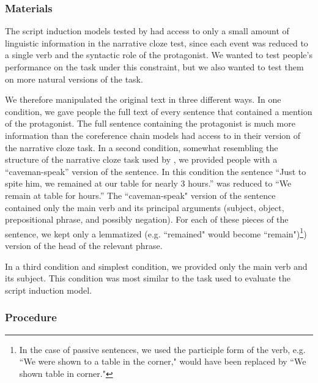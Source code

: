 \documentclass[10pt,a4paper]{article}
\begin{document}
\subsubsection{Materials}

The script induction models tested by  had access to only a small amount of linguistic information in the narrative cloze test, since each event was reduced to a single verb and the syntactic role of the protagonist.
We wanted to test people's performance on the task under this constraint, but we also wanted to test them on more natural versions of the task.

We therefore manipulated the original text in three different ways.
In one condition, we gave people the full text of every sentence that contained a mention of the protagonist.
The full sentence containing the protagonist is much more information than the coreference chain models had access to in their version of the narrative cloze task.
In a second condition, somewhat resembling the structure of the narrative cloze task used by , we provided people with a ``caveman-speak'' version of the sentence.
In this condition the sentence ``Just to spite him, we remained at our table for nearly 3 hours.'' was reduced to ``We remain at table for hours.''
The ``caveman-speak" version of the sentence contained only the main verb and its principal arguments (subject, object, prepositional phrase, and possibly negation).
For each of these pieces of the sentence, we kept only a lemmatized (e.g. ``remained" would become ``remain")\footnote{In the case of passive sentences, we used the participle form of the verb, e.g. ``We were shown to a table in the corner," would have been replaced by ``We shown table in corner."}) version of the head of the relevant phrase.

In a third condition and simplest condition, we provided only the main verb and its subject. This condition was most similar to the task used to evaluate the script induction model.

\subsubsection{Procedure}
\end{document}
